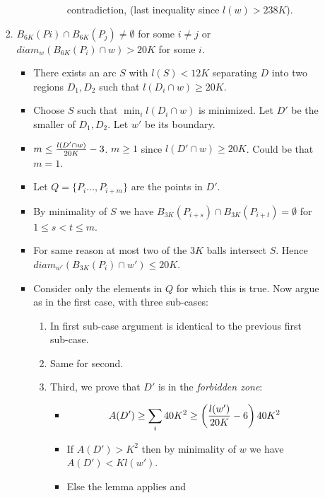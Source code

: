 \documentclass[11pt]{article} \usepackage{amssymb}
\begin{document}
\begin{enumerate}
\begin{itemize}
\begin{enumerate}
\begin{itemize}
\begin{enumerate}
\begin{itemize}
              contradiction, (last inequality since $l(w)>238K$).
            \end{itemize}
          \end{enumerate}
        \end{itemize}
      \item $B_{6K}(Pi)\cap B_{6K}(P_j)\neq\emptyset$ for some 
        $i\neq j$  or $diam_w(B_{6K}(P_i)\cap w) > 20K$ for some $i$.
        \begin{itemize}
        \item There exists an arc $S$ with $l(S)<12K$ separating $D$ 
          into two regions $D_1,D_2$ such that $l(D_i\cap w) \geq 20K$.
        \item Choose $S$ such that $\min_il(D_i\cap w)$ is minimized. Let $D'$ 
          be the smaller of $D_1,D_2$. Let $w'$ be its boundary.
        \item $m\leq {l(D'\cap w)\over 20K}-3$. $m\geq 1$ since 
          $l(D'\cap w) \geq 20K$. Could be that $m=1$.
        \item Let $Q=\{P_i\ldots, P_{i+m}\}$ are the points in $D'$.
        \item By minimality of $S$ we have 
          $B_{3K}(P_{i+s})\cap B_{3K}(P_{i+t})=\emptyset$ for $1\leq s < t \leq m$.
        \item For same reason at most two of the $3K$ balls intersect
          $S$. Hence $diam_{w'}(B_{3K}(P_i)\cap w') \leq 20K$.
        \item Consider only the elements in $Q$ for which this is true.
          Now argue as in the first case, with three sub-cases:
          \begin{enumerate}
          \item In first sub-case argument is identical to the previous first 
            sub-case.
          \item Same for second.
          \item Third, we prove that $D'$ is in the {\em forbidden zone}:
            \begin{itemize}
            \item 
              \begin{equation}
                \label{eq:dprime_area}
                A(D')\geq \sum_i 40K^2\geq \left({l(w')\over 20K}-6\right)40K^2
              \end{equation}
            \item If $A(D')>K^2$ then by minimality of $w$ we have 
              $A(D')<Kl(w')$. 
            \item Else the lemma applies and 

\end{itemize}
\end{enumerate}
\end{itemize}
\end{enumerate}
\end{itemize}
\end{enumerate}
\end{document}

